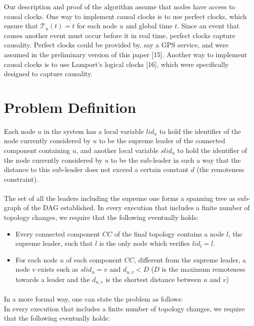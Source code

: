 Our description and proof of the algorithm assume that nodes have access to causal clocks. One way to implement causal clocks is to use perfect clocks, which ensure that $\mathcal{T}_u(t) = t$ for each node $u$ and global time $t$. Since an event that causes another event must occur before it in real time, perfect clocks capture causality. Perfect clocks could be provided by, say a GPS service, and were assumed in the preliminary version of this paper [15]. Another way to implement causal clocks is to use Lamport’s logical clocks [16], which were specifically designed to capture causality.
\newpage
\section{Problem Definition}
\paragraph{}Each node $u$ in the system has a local variable $lid_{u}$ to hold the identifier of the node currently considered by $u$ to be the supreme leader of the connected component containing $u$, and another local variable $slid_u$ to hold the identifier of the node currently considered by $u$ to be the sub-leader in such a way that the distance to this sub-leader does not exceed a certain constant $d$ (the remoteness constraint).
\paragraph{}The set of all the leaders including the supreme one forms a spanning tree as sub-graph of the DAG established.
In every execution that includes a finite number of topology changes, we require that the following eventually holds:
\begin{itemize}
	\item Every connected component $CC$ of the final topology contains a node $l$, the supreme leader, such that $l$ is the only node which verifies $ lid_{l} = l $.
	\item For each node $u$ of each component $CC$, different from the supreme leader, a node $v$ exists such as $slid_{u} = v$ and $d_{u,v} < D$ ($D$ is the maximum remoteness towards a leader and the $ d_{u,v} $ is the shortest distance between $u$ and $v$)
\end{itemize}

\paragraph{}In a more formal way, one can state the problem as follows:\\
In every execution that includes a finite number of topology changes, we require that the following eventually holds:

